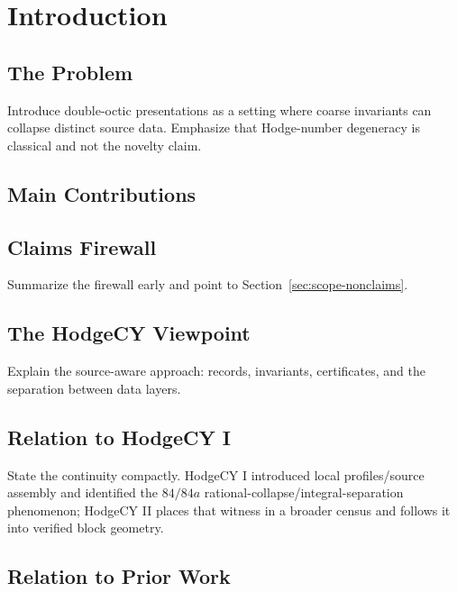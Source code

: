 \section{Introduction}\label{sec:introduction}


\subsection{The Problem}

Introduce double-octic presentations as a setting where coarse invariants can
collapse distinct source data.  Emphasize that Hodge-number degeneracy is
classical and not the novelty claim.

\subsection{Main Contributions}



\subsection{Claims Firewall}

Summarize the firewall early and point to Section~\ref{sec:scope-nonclaims}.

\subsection{The HodgeCY Viewpoint}

Explain the source-aware approach: records, invariants, certificates, and the
separation between data layers.

\subsection{Relation to HodgeCY I}

State the continuity compactly.  HodgeCY I introduced local profiles/source
assembly and identified the \(84/84a\) rational-collapse/integral-separation
phenomenon; HodgeCY II places that witness in a broader census and follows it
into verified block geometry.

\subsection{Relation to Prior Work}

